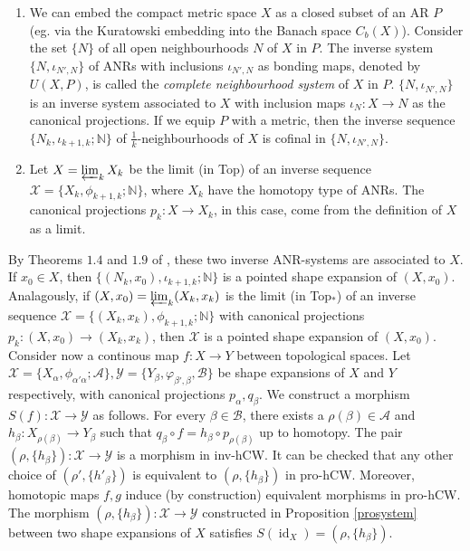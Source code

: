 \documentclass[a4paper,11pt]{article}
\theoremstyle{definition}
\theoremstyle{plain}
\theoremstyle{remark}
\DeclareMathOperator{\id}{id}
\begin{document}
{\begin{enumerate}
\item We can embed the compact metric space $X$ as a closed subset of an AR $P$ (eg. via the Kuratowski embedding into the Banach space $C_{b}(X)$). Consider the set $\{N\}$ of all open neighbourhoods $N$ of $X$ in $P$. The inverse system $\{N,\iota_{N',N}\}$ of ANRs with inclusions $\iota_{N',N}$ as bonding maps, denoted by $U(X,P)$, is called the  \textit{complete neighbourhood system} of $X$ in $P$. $\{N,\iota_{N',N}\}$ is an inverse system associated to $X$ with inclusion maps $\iota_{N}: X\rightarrow N$ as the canonical projections. If we equip $P$ with a metric, then the inverse sequence  $\{N_{k}, \iota_{k+1,k};\mathbb{N}\}$ of $\frac{1}{k}$-neighbourhoods of $X$ is cofinal in $\{N,\iota_{N',N}\}$. 
\item Let $X=\varprojlim_{k} X_{k}$ be the limit (in Top) of an inverse sequence $\mathcal{X}=\{X_{k},\phi_{k+1,k};\mathbb{N}\}$, where $X_{k}$ have the homotopy type of ANRs. The canonical projections $p_{k}: X\rightarrow X_{k}$, in this case, come from the definition of $X$ as a limit. 
\end{enumerate}

By Theorems $1.4$ and $1.9$ of \cite{morita1975shapes}, these two inverse ANR-systems are associated to $X$. If $x_0\in X$, then $\{(N_{k},x_0), \iota_{k+1,k};\mathbb{N}\}$ is a pointed shape expansion of $(X,x_0)$. Analagously, if $(X,x_0)=\varprojlim_{k} (X_{k},x_{k})$ is the limit (in Top$_{\ast}$) of an inverse sequence $\mathcal{X}=\{(X_{k},x_k),\phi_{k+1,k};\mathbb{N}\}$ with canonical projections $p_{k}: (X,x_0)\rightarrow (X_{k},x_{k})$, then $\mathcal{X}$ is a pointed shape expansion of $(X,x_0)$.\\

Consider now a continous map $f:X\rightarrow Y$ between topological spaces. Let $\mathcal{X}=\{X_{\alpha},\phi_{\alpha'\alpha};\mathcal{A}\},\mathcal{Y}=\{Y_{\beta},\varphi_{\beta',\beta},\mathcal{B}\}$ be shape expansions of $X$ and $Y$ respectively, with canonical projections $p_{\alpha},q_{\beta}$. We construct a morphism $S(f): \mathcal{X}\rightarrow \mathcal{Y}$ as follows. For every $\beta\in \mathcal{B}$, there exists a $\rho(\beta)\in \mathcal{A}$ and $h_{\beta}: X_{\rho(\beta)}\rightarrow Y_{\beta}$ such that $q_{\beta}\circ f= h_{\beta}\circ p_{\rho(\beta)}$ up to homotopy. The pair $(\rho,\{h_{\beta}\}):  \mathcal{X}\rightarrow \mathcal{Y}$ is a morphism in inv-hCW. It can be checked that any other choice of $(\rho',\{h'_{\beta}\})$ is equivalent to $(\rho,\{h_{\beta}\})$ in pro-hCW. Moreover, homotopic maps  $f,g$ induce (by construction) equivalent morphisms in pro-hCW. The morphism $(\rho,\{h_{\beta}\}):\mathcal{X}\rightarrow \mathcal{Y}$ constructed in Proposition \ref{prosystem} between two shape expansions of $X$ satisfies $S(\id_{X})=(\rho,\{h_{\beta}\})$.  \\

}
\end{document}
